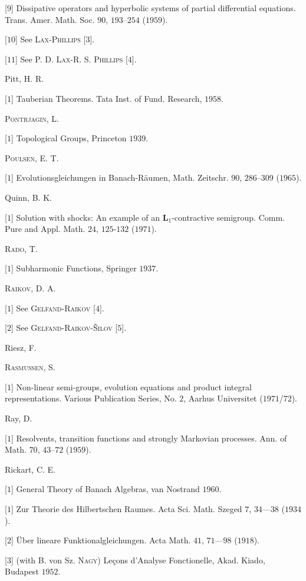 [$9$] Dissipative operators and hyperbolic systems of partial differential equations. Trans. Amer. Math. Soc. $90$, $193$--$254$ ($1959$). 

[$10$] See \textsc{Lax}-\textsc{Phillips} [$3$]. 

[$11$] See P. D. \textsc{Lax}-R. S. \textsc{Phillips} [$4$]. 

Pitt, H. R. 

[$1$] Tauberian Theorems. Tata Inst. of Fund. Research, $1958$. 

\textsc{Pontrjagin}, L. 

[$1$] Topological Groups, Princeton $1939$. 

\textsc{Poulsen}, E. T. 

[$1$] Evolutionsgleichungen in Banach-Räumen, Math. Zeitschr. $90$, $286$--$309$ ($1965$). 

Quinn, B. K. 

[$1$] Solution with shocks: An example of an $\mathbf{L}_1$-contractive semigroup. Comm. Pure and Appl. Math. $24$, $125$-$132$ ($1971$). 

\textsc{Rado}, T. 

[$1$] Subharmonic Functions, Springer $1937$. 

\textsc{Raikov}, D. A. 

[$1$] See \textsc{Gelfand}-\textsc{Raikov} [$4$]. 

[$2$] See \textsc{Gelfand}-\textsc{Raikov}-\textsc{Šilov} [$5$]. 

Riesz, F. 

\textsc{Rasmussen}, S. 

[$1$] Non-linear semi-groups, evolution equations and product integral representations. Various Publication Series, No. $2$, Aarhus Universitet ($1971$/$72$). 

Ray, D. 

[$1$] Resolvents, transition functions and strongly Markovian processes. Ann. of Math. $70$, $43$--$72$ ($1959$). 

Rickart, C. E. 

[$1$] General Theory of Banach Algebras, van Nostrand $1960$. 

[$1$] Zur Theorie des Hilbertschen Raumes. Acta Sci. Math. Szeged $7$, $34$---$38$ ($1934$). 

[$2$] Über lineare Funktionalgleichungen. Acta Math. $41$, $71$---$98$ ($1918$). 

[$3$] (with B. von Sz. \textsc{Nagy}) Leçons d'Analyse Fonctionelle, Akad. Kiado, Budapest $1952$. 

